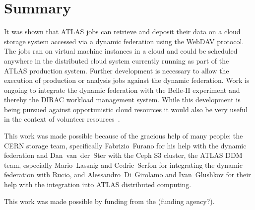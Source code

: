 \documentclass[a4paper]{jpconf}
\begin{document}
\section{Summary}
It was shown that ATLAS jobs can retrieve and deposit their data on a cloud storage system accessed via a dynamic federation using the WebDAV protocol. The jobs ran on virtual machine instances in a cloud and could be scheduled anywhere in the distributed cloud system currently running as part of the ATLAS production system. Further development is necessary to allow the execution of production or analysis jobs against the dynamic federation. Work is ongoing to integrate the dynamic federation with the Belle-II experiment and thereby the DIRAC workload management system. While this development is being pursued against opportunistic cloud resources it would also be very useful in the context of volunteer resources~\cite{boinc}.

\ack
This work was made possible because of the gracious help of many people: the CERN storage team, specifically Fabrizio~Furano for his help with the dynamic federation and Dan~van~der~Ster with the Ceph S3 cluster, the ATLAS DDM team, especially Mario~Lassnig and Cedric~Serfon for integrating the dynamic federation with Rucio, and Alessandro~Di~Girolamo and Ivan~Glushkov for their help with the integration into ATLAS distributed computing.

This work was made possible by funding from the (funding agency?).
\end{document}
